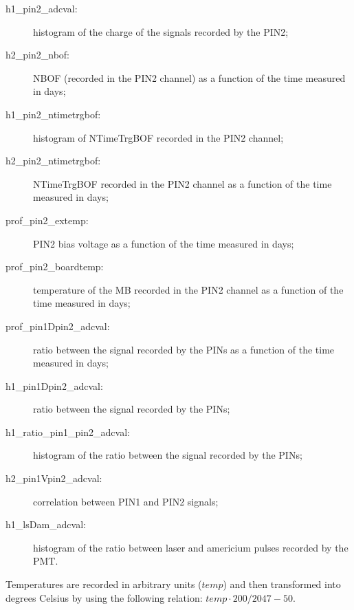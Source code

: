 \begin{description}
   \item[h1\_pin2\_adcval:] histogram of the charge of the signals recorded by the PIN2;
   \item[h2\_pin2\_nbof:] NBOF (recorded in the PIN2 channel) as a function of the time measured in days;
   \item[h1\_pin2\_ntimetrgbof:] histogram of NTimeTrgBOF recorded in the PIN2 channel;
   \item[h2\_pin2\_ntimetrgbof:]  NTimeTrgBOF recorded in the PIN2 channel as a function of the time measured in days;
   \item[prof\_pin2\_extemp:] PIN2 bias voltage as a function of the time measured in days;
   \item[prof\_pin2\_boardtemp:] temperature of the MB recorded in the PIN2 channel as a function of the time measured in days;
   \item[prof\_pin1Dpin2\_adcval:] ratio between the signal recorded by the PINs as a function of the time measured in days;
   \item[h1\_pin1Dpin2\_adcval:]  ratio between the signal recorded by the PINs;	
   \item[h1\_ratio\_pin1\_pin2\_adcval:]  histogram of the ratio between the signal recorded by the PINs;
   \item[h2\_pin1Vpin2\_adcval:]  correlation between PIN1 and PIN2 signals;  
       	\item[h1\_lsDam\_adcval:]  histogram of the ratio between laser and americium pulses recorded by the PMT.	
\end{description}


Temperatures are recorded in arbitrary units ($temp$) and then transformed into degrees Celsius by using the following relation: $temp \cdot 200/2047-50$.


